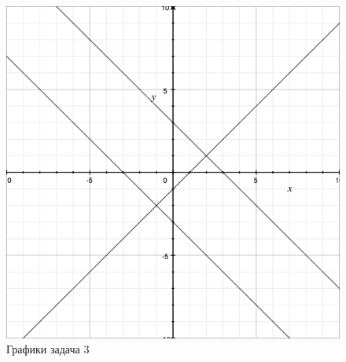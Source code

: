 \documentclass[]{article}
\begin{document}
\begin{figure}[h]
\caption{Графики задача 3}
\centering
\includegraphics[width=\textwidth]{graph3}
\end{figure}
\end{document}
